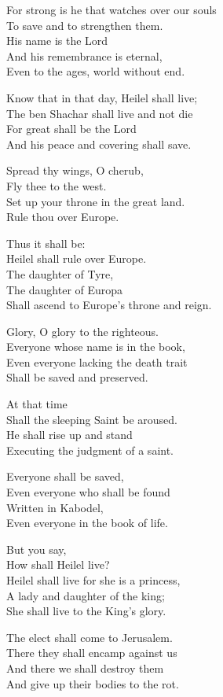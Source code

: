 \documentclass[
]{book}
\begin{document}
For strong is he that watches over our souls\\
To save and to strengthen them.\\
His name is the Lord\\
And his remembrance is eternal,\\
Even to the ages, world without end.

Know that in that day, Heilel shall live;\\
The ben Shachar shall live and not die\\
For great shall be the Lord\\
And his peace and covering shall save.

Spread thy wings, O cherub,\\
Fly thee to the west.\\
Set up your throne in the great land.\\
Rule thou over Europe.

Thus it shall be:\\
Heilel shall rule over Europe.\\
The daughter of Tyre,\\
The daughter of Europa\\
Shall ascend to Europe's throne and reign.

Glory, O glory to the righteous.\\
Everyone whose name is in the book,\\
Even everyone lacking the death trait\\
Shall be saved and preserved.

At that time\\
Shall the sleeping Saint be aroused.\\
He shall rise up and stand\\
Executing the judgment of a saint.

Everyone shall be saved,\\
Even everyone who shall be found\\
Written in Kabodel,\\
Even everyone in the book of life.

But you say,\\
How shall Heilel live?\\
Heilel shall live for she is a princess,\\
A lady and daughter of the king;\\
She shall live to the King's glory.

The elect shall come to Jerusalem.\\
There they shall encamp against us\\
And there we shall destroy them\\
And give up their bodies to the rot.
\end{document}
